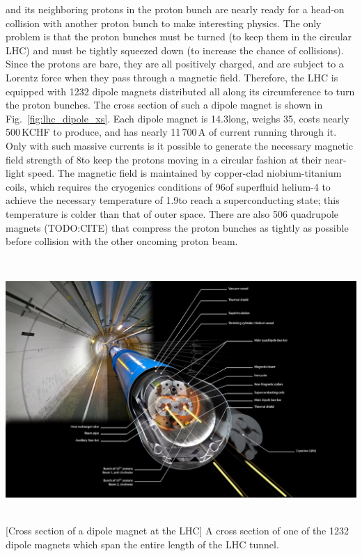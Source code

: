 \pname and its neighboring protons in the proton bunch are nearly ready for a head-on collision with another proton bunch to make interesting physics.
The only problem is that the proton bunches must be turned (to keep them in the circular LHC) and must be tightly squeezed down (to increase the chance of \pp collisions).
Since the protons are bare, they are all positively charged, and are subject to a Lorentz force when they pass through a magnetic field.
Therefore, the LHC is equipped with 1232 dipole magnets distributed all along its circumference to turn the proton bunches.
The cross section of such a dipole magnet is shown in Fig.~\ref{fig:lhc_dipole_xs}.
Each dipole magnet is 14.3\meter long, weighs 35\tonne, costs nearly 500\,KCHF to produce, and has nearly 11\,700\,A of current running through it.  %
Only with such massive currents is it possible to generate the necessary magnetic field strength of 8\tesla to keep the protons moving in a circular fashion at their near-light speed. 
The magnetic field is maintained by copper-clad niobium-titanium coils, which requires the cryogenics conditions of 96\tonne of superfluid helium-4 to achieve the necessary temperature of 1.9\kelvin to reach a superconducting state; 
this temperature is colder than that of outer space.
There are also 506 quadrupole magnets (TODO:CITE) that compress the proton bunches as tightly as possible before collision with the other oncoming proton beam.
\begin{multiFigure}
\centering
    \includegraphics[height=10cm,keepaspectratio]{figures/lhc/lhc_dipole_xs.jpg}
        [Cross section of a dipole magnet at the LHC]
        {A cross section of one of the 1232 dipole magnets which span the entire length of the LHC tunnel.} 
    \label{fig:lhc_dipole_xs}
\end{multiFigure}

